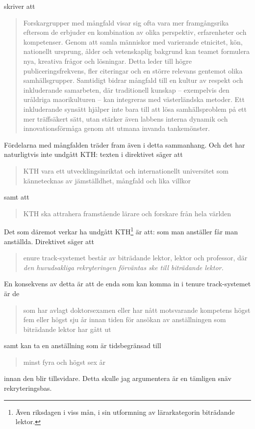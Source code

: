 \documentclass[a4paper,oneside,article,swedish]{memoir}
\begin{document}
\Textcite{DiverseLabs} skriver att
\blockcquote[%
  Sammanfattat av o3-mini:
  \texttt{pdf2txt ./nature-diverse-teams.pdf | sc \enquote{Sammanfatta vad det 
  är som gör att forskarlag med mångfald är bättre.}}
]{DiverseLabs}{%
  Forskargrupper med mångfald visar sig ofta vara mer framgångsrika eftersom de 
  erbjuder en kombination av olika perspektiv, erfarenheter och kompetenser. 
  Genom att samla människor med varierande etnicitet, kön, nationellt ursprung, 
  ålder och vetenskaplig bakgrund kan teamet formulera nya, kreativa frågor och 
  lösningar. Detta leder till högre publiceringsfrekvens, fler citeringar och 
  en större relevans gentemot olika samhällsgrupper. Samtidigt bidrar mångfald 
  till en kultur av respekt och inkluderande samarbeten, där traditionell 
  kunskap – exempelvis den uråldriga maorikulturen – kan integreras med 
  västerländska metoder. Ett inkluderande synsätt hjälper inte bara till att 
  lösa samhällsproblem på ett mer träffsäkert sätt, utan stärker även labbens 
  interna dynamik och innovationsförmåga genom att utmana invanda 
  tankemönster.%
}
Fördelarna med mångfalden träder fram även i detta sammanhang.
Och det har naturligtvis inte undgått KTH:
texten i direktivet säger att
\blockcquote[s.~1]{direktiv}{%
  KTH  vara ett utvecklingsinriktat och internationellt 
  universitet som kännetecknas av jämställdhet, mångfald och lika villkor%
} samt att
\blockcquote[s.~1]{direktiv}{%
  KTH ska attrahera framstående lärare och forskare från hela världen%
}.
Det som däremot verkar ha undgått KTH\footnote{%
  Även riksdagen i viss mån, i sin utformning av lärarkategorin biträdande 
  lektor.
} är att: som man anställer får man anställda.
Direktivet säger att
\blockcquote[s.~2, min emfas]{direktiv}{%
  enure track-systemet består av biträdande lektor, lektor och 
  professor, där \emph{den huvudsakliga rekryteringen förväntas ske till 
  biträdande lektor.}%
}
En konsekvens av detta är att de enda som kan komma in i tenure track-systemet 
är de
\blockcquote[4 kap, 4 a §]{Högskoleförordningen}{%
  som har avlagt doktorsexamen eller har nått motsvarande kompetens högst fem 
  eller högst sju år innan tiden för ansökan av anställningen som biträdande 
  lektor har gått ut%
} samt kan ta en anställning som är tidsbegränsad till
\blockcquote[4 kap, 12 a §]{Högskoleförordningen}{%
  minst fyra och högst sex år%
} innan den blir tillsvidare.
Detta skulle jag argumentera är en tämligen snäv rekryteringsbas.
\end{document}
